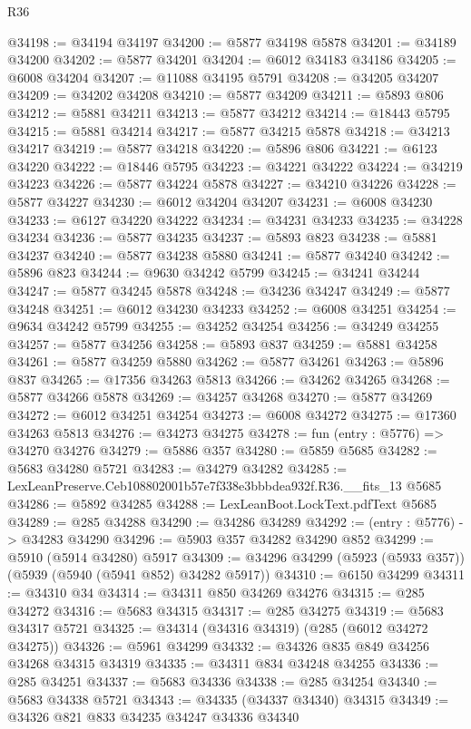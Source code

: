 \begin{lexlean}{R36}
\begin{coremodule}
@34198 := @34194 @34197
@34200 := @5877 @34198 @5878
@34201 := @34189 @34200
@34202 := @5877 @34201
@34204 := @6012 @34183 @34186
@34205 := @6008 @34204
@34207 := @11088 @34195 @5791
@34208 := @34205 @34207
@34209 := @34202 @34208
@34210 := @5877 @34209
@34211 := @5893 @806
@34212 := @5881 @34211
@34213 := @5877 @34212
@34214 := @18443 @5795
@34215 := @5881 @34214
@34217 := @5877 @34215 @5878
@34218 := @34213 @34217
@34219 := @5877 @34218
@34220 := @5896 @806
@34221 := @6123 @34220
@34222 := @18446 @5795
@34223 := @34221 @34222
@34224 := @34219 @34223
@34226 := @5877 @34224 @5878
@34227 := @34210 @34226
@34228 := @5877 @34227
@34230 := @6012 @34204 @34207
@34231 := @6008 @34230
@34233 := @6127 @34220 @34222
@34234 := @34231 @34233
@34235 := @34228 @34234
@34236 := @5877 @34235
@34237 := @5893 @823
@34238 := @5881 @34237
@34240 := @5877 @34238 @5880
@34241 := @5877 @34240
@34242 := @5896 @823
@34244 := @9630 @34242 @5799
@34245 := @34241 @34244
@34247 := @5877 @34245 @5878
@34248 := @34236 @34247
@34249 := @5877 @34248
@34251 := @6012 @34230 @34233
@34252 := @6008 @34251
@34254 := @9634 @34242 @5799
@34255 := @34252 @34254
@34256 := @34249 @34255
@34257 := @5877 @34256
@34258 := @5893 @837
@34259 := @5881 @34258
@34261 := @5877 @34259 @5880
@34262 := @5877 @34261
@34263 := @5896 @837
@34265 := @17356 @34263 @5813
@34266 := @34262 @34265
@34268 := @5877 @34266 @5878
@34269 := @34257 @34268
@34270 := @5877 @34269
@34272 := @6012 @34251 @34254
@34273 := @6008 @34272
@34275 := @17360 @34263 @5813
@34276 := @34273 @34275
@34278 := fun (entry : @5776) => @34270 @34276
@34279 := @5886 @357
@34280 := @5859 @5685
@34282 := @5683 @34280 @5721
@34283 := @34279 @34282
@34285 := LexLeanPreserve.Ceb108802001b57e7f338e3bbbdea932f.R36.__fits_13 @5685
@34286 := @5892 @34285
@34288 := LexLeanBoot.LockText.pdfText @5685
@34289 := @285 @34288
@34290 := @34286 @34289
@34292 := (entry : @5776) -> @34283 @34290
@34296 := @5903 @357 @34282 @34290 @852
@34299 := @5910 (@5914 @34280) @5917
@34309 := @34296 @34299 (@5923 (@5933 @357)) (@5939 (@5940 (@5941 @852) @34282 @5917))
@34310 := @6150 @34299
@34311 := @34310 @34
@34314 := @34311 @850 @34269 @34276
@34315 := @285 @34272
@34316 := @5683 @34315
@34317 := @285 @34275
@34319 := @5683 @34317 @5721
@34325 := @34314 (@34316 @34319) (@285 (@6012 @34272 @34275))
@34326 := @5961 @34299
@34332 := @34326 @835 @849 @34256 @34268 @34315 @34319
@34335 := @34311 @834 @34248 @34255
@34336 := @285 @34251
@34337 := @5683 @34336
@34338 := @285 @34254
@34340 := @5683 @34338 @5721
@34343 := @34335 (@34337 @34340) @34315
@34349 := @34326 @821 @833 @34235 @34247 @34336 @34340

\end{coremodule}
\end{lexlean}
